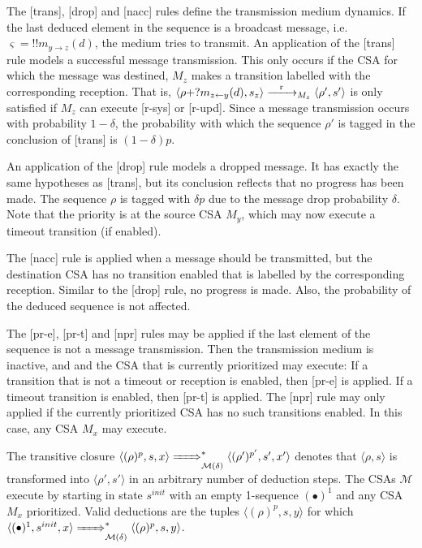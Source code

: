\documentclass{sig-alternate}
\renewcommand{\d}{\delta}
\newcommand{\M}{\mathcal{M}}
\begin{document}
The [trans], [drop] and [nacc] rules define the transmission medium dynamics. If the last deduced element in the sequence is a broadcast message, i.e.\ $\varsigma = !!m_{y \rightarrow z}(d)$, the medium tries to transmit. An application of the [trans] rule models a successful message transmission. This only occurs if the CSA for which the message was destined, $M_z$ makes a transition labelled with the corresponding reception. That is, $\langle \rho + ?m_{z \leftarrow y}(d), s_z \rangle \xrightarrow{\hspace{0.3cm}{\mathrm{r}}\hspace{0.3cm}}_{M_{z}} \langle \rho', s' \rangle$ is only satisfied if $M_z$ can execute [r-sys] or [r-upd]. Since a message transmission occurs with probability $1-\d$, the probability with which the sequence $\rho'$ is tagged in the conclusion of [trans] is $(1-\d)p$.

An application of the [drop] rule models a dropped message. It has exactly the same hypotheses as [trans], but its conclusion reflects that no progress has been made. The sequence $\rho$ is tagged with $\d p$ due to the message drop probability $\d$. Note that the priority is at the source CSA $M_y$, which may now execute a timeout transition (if enabled).

The [nacc] rule is applied when a message should be transmitted, but the destination CSA has no transition enabled that is labelled by the corresponding reception. Similar to the [drop] rule, no progress is made. Also, the probability of the deduced sequence is not affected.

The [pr-e], [pr-t] and [npr] rules may be applied if the last element of the sequence is not a message transmission. Then the transmission medium is inactive, and and the CSA that is currently prioritized may execute: If a transition that is not a timeout or reception is enabled, then [pr-e] is applied. If a timeout transition is enabled, then [pr-t] is applied. The [npr] rule may only applied if the currently prioritized CSA has no such transitions enabled. In this case, any CSA $M_x$ may execute.

The transitive closure $\langle (\rho)^p, s, x \rangle \bigstep{}^* \langle (\rho')^{p'}, s', x' \rangle$ denotes that $\langle \rho, s \rangle$ is transformed into $\langle \rho', s' \rangle$ in an arbitrary number of deduction steps. The CSAs $\M$ execute by starting in state $s^{init}$ with an empty 1-sequence $(\bullet)^1$ and any CSA $M_x$ prioritized. Valid deductions are the tuples $\langle (\rho)^{p}, s, y \rangle$ for which $\langle (\bullet)^1, s^{init}, x \rangle \bigstep{}^* \langle (\rho)^{p}, s, y \rangle$.
\end{document}
